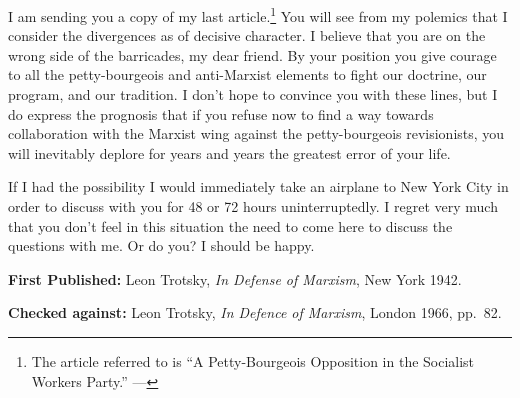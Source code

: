 \label{1939-12-20_a-letter-to-max-shachtman}


I am sending you a copy of my last article.\footnote{The article referred to is ``A Petty-Bourgeois Opposition in the Socialist Workers Party.'' ---\ed} You will see from my polemics that I consider the divergences as of decisive character. I believe that you are on the wrong side of the barricades, my dear friend. By your position you give courage to all the petty-bourgeois and anti-Marxist elements to fight our doctrine, our program, and our tradition. I don’t hope to convince you with these lines, but I do express the prognosis that if you refuse now to find a way towards collaboration with the Marxist wing against the petty-bourgeois revisionists, you will inevitably deplore for years and years the greatest error of your life.

If I had the possibility I would immediately take an airplane to New York City in order to discuss with you for 48 or 72 hours uninterruptedly. I regret very much that you don’t feel in this situation the need to come here to discuss the questions with me. Or do you? I should be happy.


\begin{letterinfo}
	\textbf{First Published:} Leon Trotsky, \emph{In Defense of Marxism}, New York 1942.
	
	\textbf{Checked against:} Leon Trotsky, \emph{In Defence of Marxism}, London 1966, pp.~82.
\end{letterinfo}